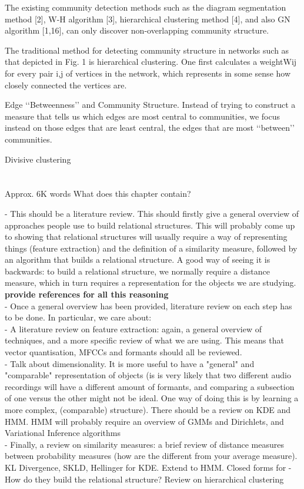 \documentclass[../main.tex]{subfiles}
\begin{document}
\cite{Lu2012}
    The existing community detection methods such as the
diagram segmentation method [2], W-H algorithm [3], hierarchical clustering method [4], and also GN algorithm [1,16], can
only discover non-overlapping community
structure.


\cite{Girvan2002}
The traditional method for detecting community structure in networks such as that depicted in Fig. 1 is
hierarchical clustering. One first calculates a weightWij for every
pair i,j of vertices in the network, which represents in some sense
how closely connected the vertices are.


Edge ‘‘Betweenness’’ and Community Structure.
Instead of trying to construct a measure that tells us which
edges are most central to communities, we focus instead on those
edges that are least central, the edges that are most ‘‘between’’
communities.

\cite{hastie2008}
Divisive clustering
\section{}





Approx. 6K words
What does this chapter contain?

- This should be a literature review. This should firstly give a general overview of approaches people use to build relational structures. This will probably come up to showing that relational structures will usually require a way of representing things (feature extraction) and the definition of a similarity measure, followed by an algorithm that builds a relational structure. A good way of seeing it is backwards: to build a relational structure, we normally require a distance measure, which in turn requires a representation for the objects we are studying. \textbf{provide references for all this reasoning}\\
- Once a general overview has been provided, literature review on each step has to be done. In particular, we care about:\\
- A literature review on feature extraction: again, a general overview of techniques, and a more specific review of what we are using. This means that vector quantisation, MFCCs and formants should all be reviewed.\\
- Talk about dimensionality. It is more useful to have a "general" and "comparable" representation of objects (is is very likely that two different audio recordings will have a different amount of formants, and comparing a subsection of one versus the other might not be ideal. One way of doing this is by learning a more complex, (comparable) structure). There should be a review on KDE and HMM. HMM will probably require an overview of GMMs and Dirichlets, and Variational Inference algorithms\\
- Finally, a review on similarity measures: a brief review of distance measures between probability measures (how are the different from your average measure). KL Divergence, SKLD, Hellinger for KDE. Extend to HMM. Closed forms for 
- How do they build the relational structure? Review on hierarchical clustering
\end{document}
